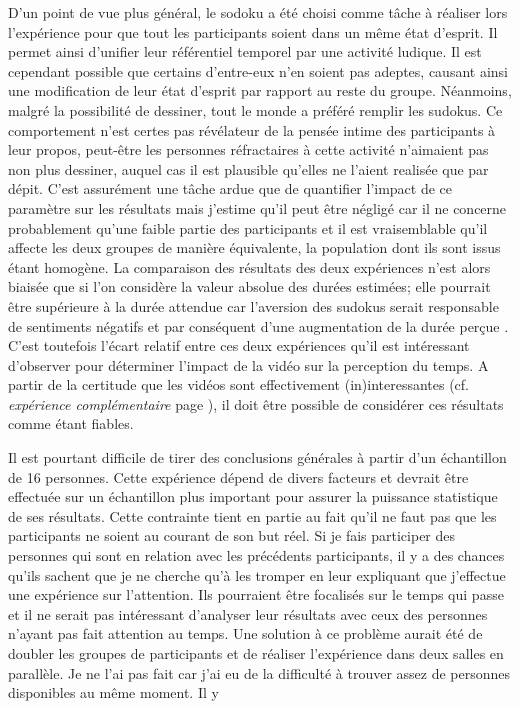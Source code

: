 \documentclass[12pt,fleqn,oneside,openany]{book} %
\begin{document}
D'un point de vue plus général, le sodoku a été choisi comme tâche à réaliser lors l'expérience pour que tout les participants soient dans un même état d'esprit. Il permet ainsi d'unifier leur référentiel temporel par une activité ludique. Il est cependant possible que certains d'entre-eux n'en soient pas adeptes, causant ainsi une modification de leur état d'esprit par rapport au reste du groupe. Néanmoins, malgré la possibilité de dessiner, tout le monde a préféré remplir les sudokus. Ce comportement n'est certes pas révélateur de la pensée intime des participants à leur propos, peut-être les personnes réfractaires à cette activité n'aimaient pas non plus dessiner, auquel cas il est plausible qu'elles ne l'aient realisée que par dépit. C'est assurément une tâche ardue que de quantifier l'impact de ce paramètre sur les résultats mais j'estime qu'il peut être négligé car il ne concerne probablement qu'une faible partie des participants et il est vraisemblable qu'il affecte les deux groupes de manière équivalente, la population dont ils sont issus étant homogène. La comparaison des résultats des deux expériences n'est alors biaisée que si l'on considère la valeur absolue des durées estimées; elle pourrait être supérieure à la durée attendue car l'aversion des sudokus serait responsable de sentiments négatifs et par conséquent d'une augmentation de la durée perçue \cite{emotionsTemps,emotionsTemps2}. C'est toutefois l'écart relatif entre ces deux expériences qu'il est intéressant d'observer pour déterminer l'impact de la vidéo sur la perception du temps. A partir de la certitude que les vidéos sont effectivement (in)interessantes (cf. \emph{expérience complémentaire} page \pageref{ssec:exp2.2}), il doit être possible de considérer ces résultats comme étant fiables.

Il est pourtant difficile de tirer des conclusions générales à partir d'un échantillon de 16 personnes. Cette expérience dépend de divers facteurs et devrait être effectuée sur un échantillon plus important pour assurer la puissance statistique de ses résultats. Cette contrainte tient en partie au fait qu'il ne faut pas que les participants ne soient au courant de son but réel. Si je fais participer des personnes qui sont en relation avec les précédents participants, il y a des chances qu'ils sachent que je ne cherche qu'à les tromper en leur expliquant que j'effectue une expérience sur l'attention. Ils pourraient être focalisés sur le temps qui passe et il ne serait pas intéressant d'analyser leur résultats avec ceux des personnes n'ayant pas fait attention au temps. Une solution à ce problème aurait été de doubler les groupes de participants et de réaliser l'expérience dans deux salles en parallèle. Je ne l'ai pas fait car j'ai eu de la difficulté à trouver assez de personnes disponibles au même moment. Il y 
\end{document}
